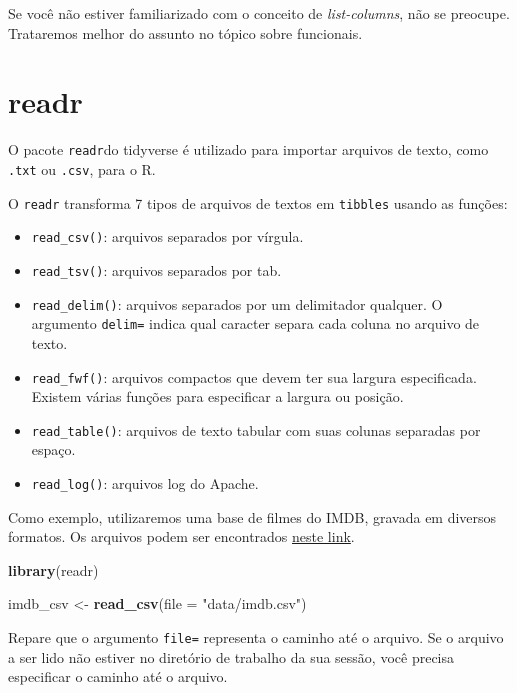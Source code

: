 \documentclass[]{book}
\newenvironment{Shaded}{\begin{snugshade}}{\end{snugshade}}
\newcommand{\DataTypeTok}[1]{\textcolor[rgb]{0.13,0.29,0.53}{#1}}
\newcommand{\KeywordTok}[1]{\textcolor[rgb]{0.13,0.29,0.53}{\textbf{#1}}}
\newcommand{\NormalTok}[1]{#1}
\newcommand{\StringTok}[1]{\textcolor[rgb]{0.31,0.60,0.02}{#1}}
\providecommand{\tightlist}{%
  \setlength{\itemsep}{0pt}\setlength{\parskip}{0pt}}
\begin{document}
Se você não estiver familiarizado com o conceito de \emph{list-columns}, não se preocupe. Trataremos melhor do assunto no tópico sobre funcionais.

\hypertarget{readr}{%
\section{readr}\label{readr}}

O pacote \texttt{readr}do tidyverse é utilizado para importar arquivos de texto, como \texttt{.txt} ou \texttt{.csv}, para o R.

O \texttt{readr} transforma 7 tipos de arquivos de textos em \texttt{tibbles} usando as funções:

\begin{itemize}
\tightlist
\item
  \texttt{read\_csv()}: arquivos separados por vírgula.
\item
  \texttt{read\_tsv()}: arquivos separados por tab.
\item
  \texttt{read\_delim()}: arquivos separados por um delimitador qualquer. O argumento \texttt{delim=} indica qual caracter separa cada coluna no arquivo de texto.
\item
  \texttt{read\_fwf()}: arquivos compactos que devem ter sua largura especificada. Existem várias funções para especificar a largura ou posição.
\item
  \texttt{read\_table()}: arquivos de texto tabular com suas colunas separadas por espaço.
\item
  \texttt{read\_log()}: arquivos log do Apache.
\end{itemize}

Como exemplo, utilizaremos uma base de filmes do IMDB, gravada em diversos formatos. Os arquivos podem ser encontrados \href{https://github.com/curso-r/site-v2/raw/master/content/material/importacao/data/imdb.rds}{neste link}.

\begin{Shaded}
\begin{Highlighting}[]
\KeywordTok{library}\NormalTok{(readr)}

\NormalTok{imdb_csv <-}\StringTok{ }\KeywordTok{read_csv}\NormalTok{(}\DataTypeTok{file =} \StringTok{"data/imdb.csv"}\NormalTok{)}
\end{Highlighting}
\end{Shaded}

Repare que o argumento \texttt{file=} representa o caminho até o arquivo. Se o arquivo a ser lido não estiver no diretório de trabalho da sua sessão, você precisa especificar o caminho até o arquivo.
\end{document}
